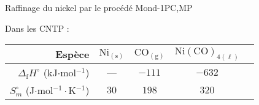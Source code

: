 \begin{exercise}{Raffinage du nickel par le procédé Mond}{-1}{PC,MP}
\begin{questions}
    Dans les CNTP :
    \begin{center}
\begin{table}[H]
    \qquad\begin{tabular}{r|cccc}
        Espèce & $\mathrm{Ni_{(s)}}$ & $\mathrm{CO_{(g)}}$ & $\mathrm{Ni(CO)_{4 (\ell)}}$ \\ \hline\hline
        $\Delta_\text{f}H^\circ$ (kJ$\cdot$mol$^{-1}$) & --- & $-111$ & $-632$ \\
        $S_m^\circ$ (J$\cdot$mol$^{-1}\cdot$K$^{-1}$) & $30$ & $198$ & $320$ \\ \hline
    \end{tabular}
\end{table}
    \end{center}
\end{questions}

\end{exercise}




